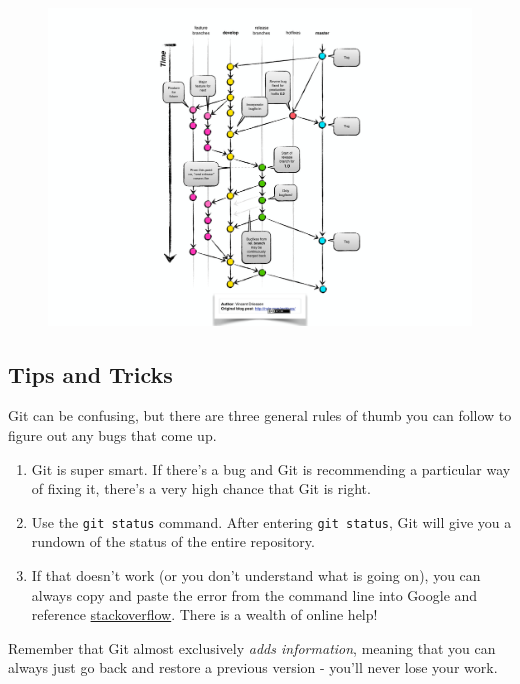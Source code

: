 \documentclass[]{book}
\begin{document}
\begin{figure}
\centering
\includegraphics{images/gitflow-model.png}
\caption{}
\end{figure}

\subsection{Tips and Tricks}\label{tips-and-tricks-2}

Git can be confusing, but there are three general rules of thumb you can
follow to figure out any bugs that come up.

\begin{enumerate}
\def\labelenumi{\arabic{enumi}.}
\item
  Git is super smart. If there's a bug and Git is recommending a
  particular way of fixing it, there's a very high chance that Git is
  right.
\item
  Use the \texttt{git\ status} command. After entering
  \texttt{git\ status}, Git will give you a rundown of the status of the
  entire repository.
\item
  If that doesn't work (or you don't understand what is going on), you
  can always copy and paste the error from the command line into Google
  and reference
  \href{https://stackoverflow.com/questions/tagged/git}{stackoverflow}.
  There is a wealth of online help!
\end{enumerate}

Remember that Git almost exclusively \emph{adds information}, meaning
that you can always just go back and restore a previous version - you'll
never lose your work.
\end{document}
